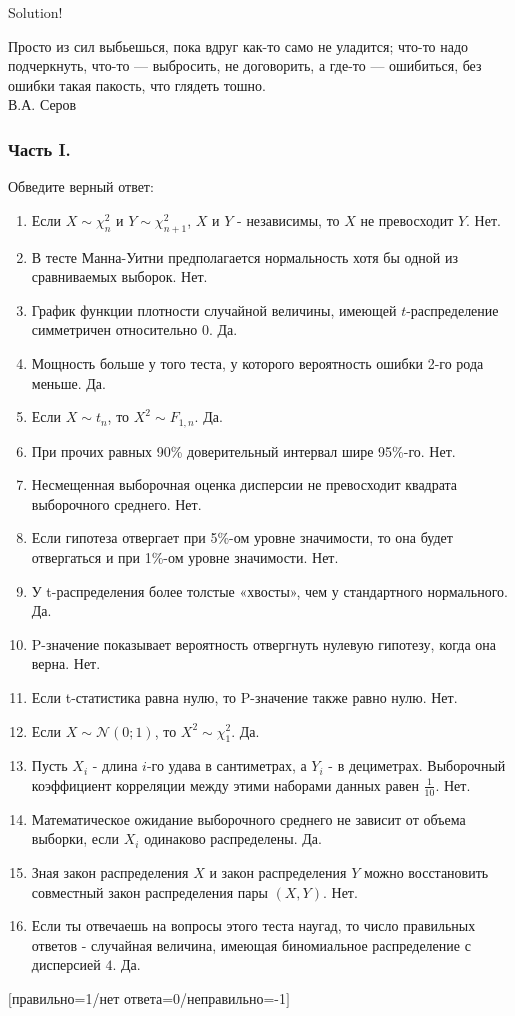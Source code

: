 \documentclass[12pt, a4paper]{article}\usepackage[]{graphicx}\usepackage[]{color}
\begin{document}
Solution!

Просто из сил выбьешься, пока вдруг как-то само не уладится;
что-то надо подчеркнуть, что-то — выбросить, не договорить, а
где-то — ошибиться, без ошибки такая пакость, что глядеть тошно. \\
В.А. Серов \\

\subsubsection*{Часть I.}

Обведите верный ответ:

\begin{enumerate}
\item Если $X\sim \chi_{n}^{2}$ и $Y\sim \chi_{n+1}^{2}$, $X$ и $Y$ -
независимы, то  $X$ не превосходит $Y$. Нет.
\item В тесте Манна-Уитни предполагается нормальность хотя бы одной
из сравниваемых выборок. Нет.
\item График функции плотности случайной величины, имеющей
$t$-распределение симметричен относительно 0. Да.
\item Мощность больше у того теста, у которого вероятность ошибки
2-го рода меньше. Да.
\item Если $X\sim t_{n}$, то $X^{2}\sim F_{1,n}$. Да.
\item При прочих равных 90\% доверительный интервал шире 95\%-го.  Нет.
\item Несмещенная выборочная оценка дисперсии не превосходит квадрата
выборочного среднего. Нет.
\item Если гипотеза отвергает при 5\%-ом уровне значимости, то она
будет отвергаться и при 1\%-ом уровне значимости. Нет.
\item У t-распределения более толстые «хвосты», чем у стандартного
нормального. Да.
\item P-значение показывает вероятность отвергнуть нулевую гипотезу,
когда она верна. Нет.
\item Если t-статистика равна нулю, то P-значение также равно нулю.
 Нет.
\item Если $X\sim \mathcal{N}(0;1)$, то $X^{2}\sim \chi_{1}^{2}$. Да.
\item Пусть $X_{i}$ - длина $i$-го удава в сантиметрах, а $Y_{i}$ -
в дециметрах. Выборочный коэффициент корреляции между этими
наборами данных равен $\frac{1}{10}$. Нет.
\item Математическое ожидание выборочного среднего не зависит от
объема выборки, если $X_{i}$ одинаково распределены. Да.
\item Зная закон распределения $X$ и закон распределения $Y$
можно восстановить совместный закон распределения пары $(X,Y)$. Нет.
\item Если ты отвечаешь на вопросы этого теста наугад, то число
правильных ответов - случайная величина, имеющая биномиальное
распределение с дисперсией $4$. Да.
\end{enumerate}
$[$правильно=1/нет ответа=0/неправильно=-1$]$
\end{document}
